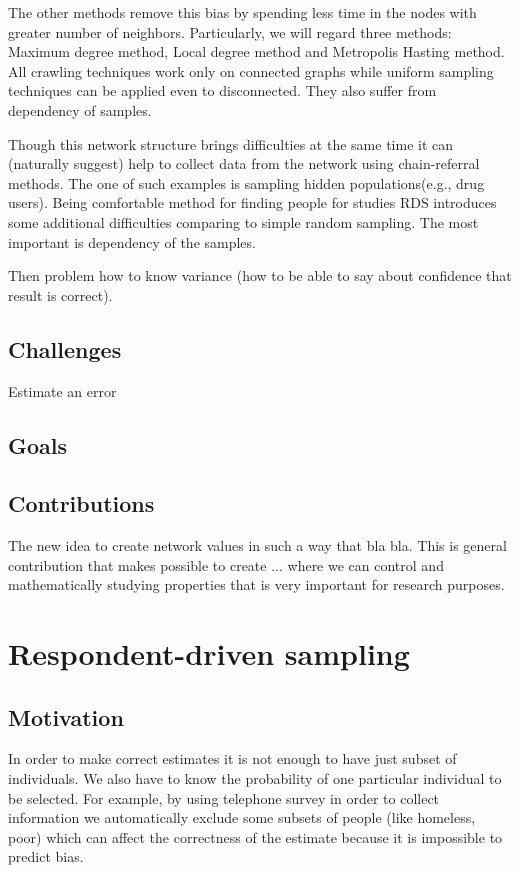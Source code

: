 \documentclass[12pt]{report}
\begin{document}
The other methods remove this bias by spending less time in the nodes with greater number of neighbors. Particularly, we will regard three methods: Maximum degree 
method, Local degree method and Metropolis Hasting method. All crawling techniques work only on connected graphs while uniform sampling techniques can be applied even to disconnected. They also suffer from dependency of samples.

Though this network structure brings difficulties at the same time it can (naturally suggest) help to collect data from the network using chain-referral methods.
The one of such examples is sampling hidden populations(e.g., drug users).
Being comfortable method for finding people for studies RDS introduces some additional difficulties comparing to simple random sampling. The most important is dependency of the samples.

Then problem how to know variance (how to be able to say about confidence that result is correct).


\section{Challenges}

Estimate an error

\section{Goals}
\section{Contributions}

The new idea to create network values in such a way that bla bla.
This is general contribution that makes possible to create ... where we can control and mathematically studying properties that is very important for research purposes.

\chapter{Respondent-driven sampling}
\section{Motivation}

In order to make correct estimates it is not enough to have just subset of individuals. We also have to know the probability of one particular individual to be selected. For example, by using telephone survey in order to collect information we automatically exclude some subsets of people (like homeless, poor) which can affect the correctness of the estimate because it is impossible to predict bias. 
\end{document}
